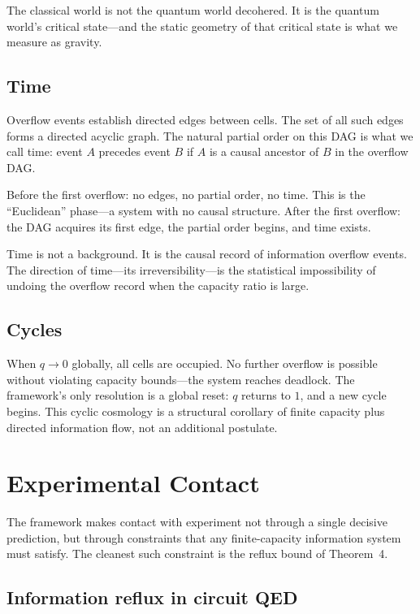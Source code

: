 \documentclass[reprint]{revtex4-2}
\begin{document}
The classical world is not the quantum world decohered. It is the quantum world's critical state---and the static geometry of that critical state is what we measure as gravity.

\subsection{Time}

Overflow events establish directed edges between cells. The set of all such edges forms a directed acyclic graph. The natural partial order on this DAG is what we call time: event $A$ precedes event $B$ if $A$ is a causal ancestor of $B$ in the overflow DAG.

Before the first overflow: no edges, no partial order, no time. This is the ``Euclidean'' phase---a system with no causal structure. After the first overflow: the DAG acquires its first edge, the partial order begins, and time exists.

Time is not a background. It is the causal record of information overflow events. The direction of time---its irreversibility---is the statistical impossibility of undoing the overflow record when the capacity ratio is large.

\subsection{Cycles}

When $q\to 0$ globally, all cells are occupied. No further overflow is possible without violating capacity bounds---the system reaches deadlock. The framework's only resolution is a global reset: $q$ returns to $1$, and a new cycle begins. This cyclic cosmology is a structural corollary of finite capacity plus directed information flow, not an additional postulate.

\section{Experimental Contact}

The framework makes contact with experiment not through a single decisive prediction, but through constraints that any finite-capacity information system must satisfy. The cleanest such constraint is the reflux bound of Theorem~4.

\subsection{Information reflux in circuit QED}
\end{document}
